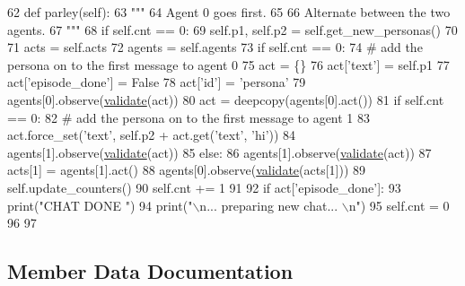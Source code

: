 \begin{DoxyCode}
62     \textcolor{keyword}{def }parley(self):
63         \textcolor{stringliteral}{"""}
64 \textcolor{stringliteral}{        Agent 0 goes first.}
65 \textcolor{stringliteral}{}
66 \textcolor{stringliteral}{        Alternate between the two agents.}
67 \textcolor{stringliteral}{        """}
68         \textcolor{keywordflow}{if} self.cnt == 0:
69             self.p1, self.p2 = self.get\_new\_personas()
70 
71         acts = self.acts
72         agents = self.agents
73         \textcolor{keywordflow}{if} self.cnt == 0:
74             \textcolor{comment}{# add the persona on to the first message to agent 0}
75             act = \{\}
76             act[\textcolor{stringliteral}{'text'}] = self.p1
77             act[\textcolor{stringliteral}{'episode\_done'}] = \textcolor{keyword}{False}
78             act[\textcolor{stringliteral}{'id'}] = \textcolor{stringliteral}{'persona'}
79             agents[0].observe(\hyperlink{namespaceparlai_1_1core_1_1worlds_afc3fad603b7bce41dbdc9cdc04a9c794}{validate}(act))
80         act = deepcopy(agents[0].act())
81         \textcolor{keywordflow}{if} self.cnt == 0:
82             \textcolor{comment}{# add the persona on to the first message to agent 1}
83             act.force\_set(\textcolor{stringliteral}{'text'}, self.p2 + act.get(\textcolor{stringliteral}{'text'}, \textcolor{stringliteral}{'hi'}))
84             agents[1].observe(\hyperlink{namespaceparlai_1_1core_1_1worlds_afc3fad603b7bce41dbdc9cdc04a9c794}{validate}(act))
85         \textcolor{keywordflow}{else}:
86             agents[1].observe(\hyperlink{namespaceparlai_1_1core_1_1worlds_afc3fad603b7bce41dbdc9cdc04a9c794}{validate}(act))
87         acts[1] = agents[1].act()
88         agents[0].observe(\hyperlink{namespaceparlai_1_1core_1_1worlds_afc3fad603b7bce41dbdc9cdc04a9c794}{validate}(acts[1]))
89         self.update\_counters()
90         self.cnt += 1
91 
92         \textcolor{keywordflow}{if} act[\textcolor{stringliteral}{'episode\_done'}]:
93             print(\textcolor{stringliteral}{"CHAT DONE "})
94             print(\textcolor{stringliteral}{"\(\backslash\)n... preparing new chat... \(\backslash\)n"})
95             self.cnt = 0
96 
97 
\end{DoxyCode}


\subsection{Member Data Documentation}
\mbox{\label{classparlai_1_1tasks_1_1convai2_1_1worlds_1_1InteractiveWorld_a3caeecc4c52e4dce168341bbb1519b03}} 
